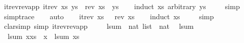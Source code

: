 \begin{isabellebody}
\isanewline
{}\isamarkupfalse%
\ itrev{\isacharunderscore}{\kern0pt}rev{\isacharunderscore}{\kern0pt}app{\isacharcolon}{\kern0pt}\ {\isachardoublequoteopen}itrev\ xs\ ys\ {\isacharequal}{\kern0pt}\ rev\ xs\ {\isacharat}{\kern0pt}\ ys{\isachardoublequoteclose}\isanewline
%
\isadelimproof
\ \ %
\endisadelimproof
%
\isatagproof
{}\isamarkupfalse%
\ {\isacharparenleft}{\kern0pt}induct\ xs\ arbitrary{\isacharcolon}{\kern0pt}\ ys{\isacharparenright}{\kern0pt}\isanewline
\ \ \ \isamarkupfalse%
\ simp\isanewline
\ \ \isamarkupfalse%
\ {\isacharbrackleft}{\kern0pt}{\isacharbrackleft}{\kern0pt}simp{\isacharunderscore}{\kern0pt}trace{\isacharbrackright}{\kern0pt}{\isacharbrackright}{\kern0pt}\isanewline
\ \ \isamarkupfalse%
\ auto\isanewline
\ \ \isamarkupfalse%
%
\endisatagproof
{\isafoldproof}%
%
\isadelimproof
\isanewline
%
\endisadelimproof
\isanewline
{}\isamarkupfalse%
\ {\isachardoublequoteopen}itrev\ xs\ {\isacharbrackleft}{\kern0pt}{\isacharbrackright}{\kern0pt}\ {\isacharequal}{\kern0pt}\ rev\ xs{\isachardoublequoteclose}\isanewline
%
\isadelimproof
\ \ %
\endisadelimproof
%
\isatagproof
{}\isamarkupfalse%
\ {\isacharparenleft}{\kern0pt}induct\ xs{\isacharparenright}{\kern0pt}\isanewline
\ \ \ \isamarkupfalse%
\ simp\isanewline
\ \ \isamarkupfalse%
\ {\isacharparenleft}{\kern0pt}clarsimp\ simp{\isacharcolon}{\kern0pt}\ itrev{\isacharunderscore}{\kern0pt}rev{\isacharunderscore}{\kern0pt}app{\isacharparenright}{\kern0pt}\isanewline
\ \ \isamarkupfalse%
\isanewline
\isanewline
%
\isamarkupcmt{----------------------------------------------------------%
}%
\endisatagproof
{\isafoldproof}%
%
\isadelimproof
\isanewline
%
\endisadelimproof
\isanewline
{}\isamarkupfalse%
\isanewline
\ \ lsum\ {\isacharcolon}{\kern0pt}{\isacharcolon}{\kern0pt}\ {\isachardoublequoteopen}nat\ list\ {\isasymRightarrow}\ nat{\isachardoublequoteclose}\isanewline
{}\isanewline
\ \ {\isachardoublequoteopen}lsum\ {\isacharbrackleft}{\kern0pt}{\isacharbrackright}{\kern0pt}\ {\isacharequal}{\kern0pt}\ {}{\isachardoublequoteclose}\ {\isacharbar}{\kern0pt}\isanewline
\ \ {\isachardoublequoteopen}lsum\ {\isacharparenleft}{\kern0pt}x{\isacharhash}{\kern0pt}xs{\isacharparenright}{\kern0pt}\ {\isacharequal}{\kern0pt}\ x\ {\isacharplus}{\kern0pt}\ lsum\ xs{\isachardoublequoteclose}\isanewline
\isanewline
{}\isamarkupfalse%

\end{isabellebody}
